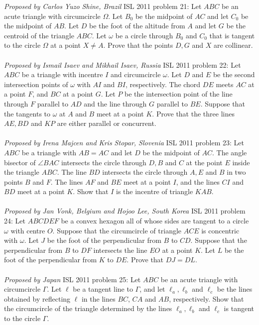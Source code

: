\textit{Proposed by Carlos Yuzo Shine, Brazil} 
ISL 2011 problem 21:  Let $ABC$ be an acute triangle with circumcircle $\Omega$. Let $B_0$ be the midpoint of $AC$ and let $C_0$ be the midpoint of $AB$. Let $D$ be the foot of the altitude from $A$ and let $G$ be the centroid of the triangle $ABC$. Let $\omega$ be a circle through $B_0$ and $C_0$ that is tangent to the circle $\Omega$ at a point $X\not= A$. Prove that the points $D,G$ and $X$ are collinear. \\\\
\textit{Proposed by Ismail Isaev and Mikhail Isaev, Russia} 
ISL 2011 problem 22:  Let $ABC$ be a triangle with incentre $I$ and circumcircle $\omega$. Let $D$ and $E$ be the second intersection points of $\omega$ with $AI$ and $BI$, respectively. The chord $DE$ meets $AC$ at a point $F$, and $BC$ at a point $G$. Let $P$ be the intersection point of the line through $F$ parallel to $AD$ and the line through $G$ parallel to $BE$. Suppose that the tangents to $\omega$ at $A$ and $B$ meet at a point $K$. Prove that the three lines $AE,BD$ and $KP$ are either parallel or concurrent. \\\\
\textit{Proposed by Irena Majcen and Kris Stopar, Slovenia} 
ISL 2011 problem 23:  Let $ABC$ be a triangle with $AB=AC$ and let $D$ be the midpoint of $AC$. The angle bisector of $\angle BAC$ intersects the circle through $D,B$  and $C$ at the point $E$  inside the triangle $ABC$. The line $BD$ intersects the circle through $A,E$ and $B$ in two points $B$ and $F$. The lines $AF$ and $BE$ meet at a point $I$, and the lines $CI$ and $BD$ meet at a point $K$. Show that $I$ is the incentre of triangle $KAB$. \\\\
\textit{Proposed by Jan Vonk, Belgium and Hojoo Lee, South Korea} 
ISL 2011 problem 24:  Let $ABCDEF$ be a convex hexagon all of whose sides are tangent to a circle $\omega$ with centre $O$. Suppose that the circumcircle of triangle $ACE$ is concentric with $\omega$. Let $J$ be the foot of the perpendicular from $B$ to $CD$. Suppose that the perpendicular from $B$ to $DF$ intersects the line $EO$ at a point $K$. Let $L$ be the foot of the perpendicular from $K$ to $DE$. Prove that $DJ=DL$. \\\\
\textit{Proposed by Japan} 
ISL 2011 problem 25:  Let $ABC$ be an acute triangle with circumcircle $\Gamma$. Let $\ell$ be a tangent line to $\Gamma$, and let $\ell_a, \ell_b$ and $\ell_c$ be the lines obtained by reflecting $\ell$ in the lines $BC$, $CA$ and $AB$, respectively. Show that the circumcircle of the triangle determined by the lines $\ell_a, \ell_b$ and $\ell_c$ is tangent to the circle $\Gamma$. \\\\
